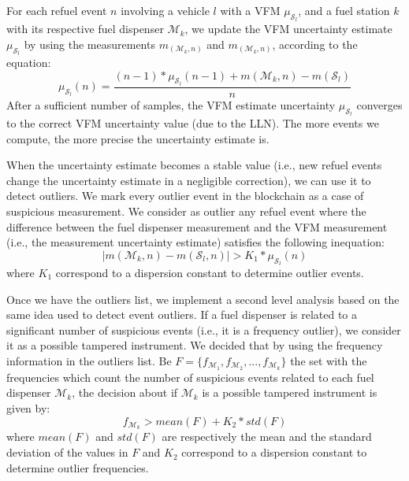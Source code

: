\documentclass[sigplan]{acmart}
\begin{document}
For each refuel event $n$ involving a vehicle $l$ with a VFM $\mu_{\mathcal{S}_l}$, and a fuel station $k$ with its respective fuel dispenser $\mathcal{M}_k$, we update the VFM uncertainty estimate $\mu_{\mathcal{S}_l}$ by using the measurements $m_(\mathcal{M}_k,n)$ and $m_(\mathcal{M}_k,n)$, according to the equation:
\begin{equation}
    \mu_{\mathcal{S}_l}(n) = \frac {(n - 1) * \mu_{\mathcal{S}_l}(n - 1) + m(\mathcal{M}_k,n) - m(\mathcal{S}_l)}{n}
\end{equation}
After a sufficient number of samples, the VFM estimate uncertainty $\mu_{\mathcal{S}_l}$ converges to the correct VFM uncertainty value (due to the LLN).
The more events we compute, the more precise the uncertainty estimate is.

When the uncertainty estimate becomes a stable value (i.e., new refuel events change the uncertainty estimate in a negligible correction), we can use it to detect outliers.
We mark every outlier event in the blockchain as a case of suspicious measurement.
We consider as outlier any refuel event where the difference between the fuel dispenser measurement and the VFM measurement (i.e., the measurement uncertainty estimate) satisfies the following inequation:
\begin{equation} \left| m(\mathcal{M}_k,n) - m(\mathcal{S}_l,n) \right| > K_1 * \mu_{\mathcal{S}_l}(n) \end{equation}
where $K_1$ correspond to a dispersion constant to determine outlier events.

Once we have the outliers list, we implement a second level analysis based on the same idea used to detect event outliers.
If a fuel dispenser is related to a significant number of suspicious events (i.e., it is a frequency outlier), we consider it as a possible tampered instrument.
We decided that by using the frequency information in the outliers list.
Be $F = \{f_{\mathcal{M}_1},f_{\mathcal{M}_2},...,f_{\mathcal{M}_k}\}$ the set with the frequencies which count the number of suspicious events related to each fuel dispenser $\mathcal{M}_k$, the decision about if $\mathcal{M}_k$ is a possible tampered instrument is given by:
\begin{equation} f_{\mathcal{M}_k} > mean(F) + K_2 * std(F) \end{equation}
where $mean(F)$ and $std(F)$ are respectively the mean and the standard deviation of the values in $F$ and $K_2$ correspond to a dispersion constant to determine outlier frequencies.
\end{document}
